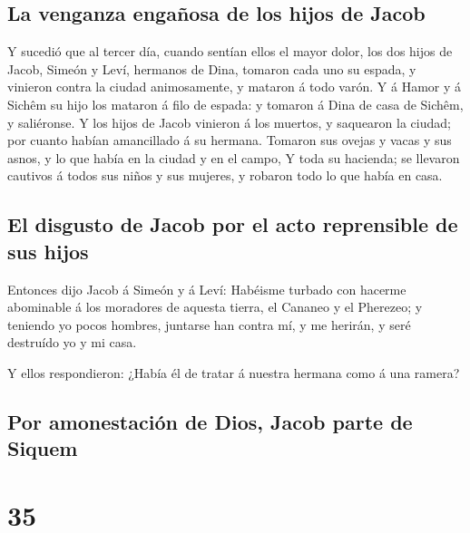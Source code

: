 \hypertarget{la-venganza-engauxf1osa-de-los-hijos-de-jacob}{%
\subsection{La venganza engañosa de los hijos de
Jacob}\label{la-venganza-engauxf1osa-de-los-hijos-de-jacob}}

 Y sucedió que al tercer día, cuando sentían ellos el
mayor dolor, los dos hijos de Jacob, Simeón y Leví, hermanos de Dina,
tomaron cada uno su espada, y vinieron contra la ciudad animosamente, y
mataron á todo varón.  Y á Hamor y á Sichêm su hijo los
mataron á filo de espada: y tomaron á Dina de casa de Sichêm, y
saliéronse.  Y los hijos de Jacob vinieron á los muertos,
y saquearon la ciudad; por cuanto habían amancillado á su hermana.
 Tomaron sus ovejas y vacas y sus asnos, y lo que había
en la ciudad y en el campo,  Y toda su hacienda; se
llevaron cautivos á todos sus niños y sus mujeres, y robaron todo lo que
había en casa.

\hypertarget{el-disgusto-de-jacob-por-el-acto-reprensible-de-sus-hijos}{%
\subsection{El disgusto de Jacob por el acto reprensible de sus
hijos}\label{el-disgusto-de-jacob-por-el-acto-reprensible-de-sus-hijos}}

 Entonces dijo Jacob á Simeón y á Leví: Habéisme turbado
con hacerme abominable á los moradores de aquesta tierra, el Cananeo y
el Pherezeo; y teniendo yo pocos hombres, juntarse han contra mí, y me
herirán, y seré destruído yo y mi casa.

 Y ellos respondieron: ¿Había él de tratar á nuestra
hermana como á una ramera?

\hypertarget{por-amonestaciuxf3n-de-dios-jacob-parte-de-siquem}{%
\subsection{Por amonestación de Dios, Jacob parte de
Siquem}\label{por-amonestaciuxf3n-de-dios-jacob-parte-de-siquem}}

\hypertarget{section-01-35}{%
\section{35}\label{section-01-35}}

